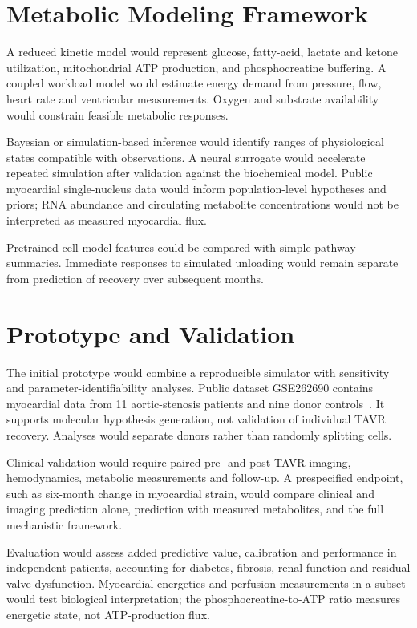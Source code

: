 \section{Metabolic Modeling Framework}
A reduced kinetic model would represent glucose, fatty-acid, lactate and ketone utilization, mitochondrial ATP production, and phosphocreatine buffering. A coupled workload model would estimate energy demand from pressure, flow, heart rate and ventricular measurements. Oxygen and substrate availability would constrain feasible metabolic responses.

Bayesian or simulation-based inference would identify ranges of physiological states compatible with observations. A neural surrogate would accelerate repeated simulation after validation against the biochemical model. Public myocardial single-nucleus data would inform population-level hypotheses and priors; RNA abundance and circulating metabolite concentrations would not be interpreted as measured myocardial flux.

Pretrained cell-model features could be compared with simple pathway summaries. Immediate responses to simulated unloading would remain separate from prediction of recovery over subsequent months.


\section{Prototype and Validation}
The initial prototype would combine a reproducible simulator with sensitivity and parameter-identifiability analyses. Public dataset GSE262690 contains myocardial data from 11 aortic-stenosis patients and nine donor controls~\cite{geo2025}. It supports molecular hypothesis generation, not validation of individual TAVR recovery. Analyses would separate donors rather than randomly splitting cells.

Clinical validation would require paired pre- and post-TAVR imaging, hemodynamics, metabolic measurements and follow-up. A prespecified endpoint, such as six-month change in myocardial strain, would compare clinical and imaging prediction alone, prediction with measured metabolites, and the full mechanistic framework.

Evaluation would assess added predictive value, calibration and performance in independent patients, accounting for diabetes, fibrosis, renal function and residual valve dysfunction. Myocardial energetics and perfusion measurements in a subset would test biological interpretation; the phosphocreatine-to-ATP ratio measures energetic state, not ATP-production flux.


